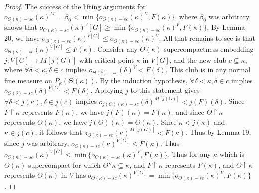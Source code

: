 \documentclass[10pt,a4paper]{amsart}
\begin{document}
\begin{proof}
 The success of the lifting arguments for $o_{\Theta(\kappa)-sc}(\kappa)^M = \beta_0 < \min\{o_{\Theta(\kappa)-sc}(\kappa)^V, F(\kappa)\}$, where $\beta_0$ was arbitrary, shows that $o_{\Theta(\kappa)-sc}(\kappa)^V[G] \ge \min\{o_{\Theta(\kappa)-sc}(\kappa)^V, F(\kappa)\}$. By Lemma 20, we have $o_{\Theta(\kappa)-sc}(\kappa)^{V[G]} \le o_{\Theta(\kappa)-sc}(\kappa)^V$. All that remains to see is that $o_{\Theta(\kappa)-sc}(\kappa)^{V[G]} \le F(\kappa)$. Consider any $\Theta(\kappa)$-supercompactness embedding $j:V[G] \to M[j(G)]$ with critical point $\kappa$ in $V[G]$, and the new club $c \subseteq \kappa$, where $\forall \delta < \kappa, \delta \in c$ implies $o_{\Theta(\delta)-sc}(\delta)^V < F(\delta)$. This club is in any normal fine measure on $P_{\kappa}(\Theta(\kappa))$. By the induction hypothesis, $\forall \delta < \kappa, \delta \in c$ implies $o_{\Theta(\delta)-sc}(\delta)^{V[G]} < F(\delta)$. Applying $j$ to this statement gives $\forall \delta < j(\kappa), \delta \in j(c)$ implies $o_{j(\Theta)(\kappa)-sc}(\delta)^{M[j(G)]} < j(F)(\delta)$. Since $F \upharpoonright \kappa$ represents $F(\kappa)$, we have $j(F)(\kappa) = F(\kappa)$, and since $\Theta \upharpoonright \kappa$ represents $\Theta(\kappa)$, we have $j(\Theta)(\kappa) = \Theta(\kappa)$. Since $\kappa < j(\kappa)$ and $\kappa \in j(c)$, it follows that $o_{\Theta(\kappa)-sc}(\kappa)^{M[j(G)]} < F(\kappa)$. Thus by Lemma 19, since $j$ was arbitrary, $o_{\Theta(\kappa)-sc}(\kappa)^{V[G]} \le F(\kappa)$. Thus $o_{\Theta(\kappa)-sc}(\kappa)^{V[G]} \le \min\{o_{\Theta(\kappa)-sc}(\kappa)^V, F(\kappa)\}.$ Thus for any $\kappa$ which is $\Theta(\kappa)$-supercompact for which $\Theta''\kappa \subseteq \kappa$, and $F \upharpoonright \kappa$ represents $F(\kappa)$, and $\Theta \upharpoonright \kappa$ represents $\Theta(\kappa)$ in $V$ has $o_{\Theta(\kappa)-sc}(\kappa)^{V[G]} = \min\{o_{\Theta(\kappa)-sc}(\kappa)^V, F(\kappa)\}$.
 \end{proof}
\end{document}

